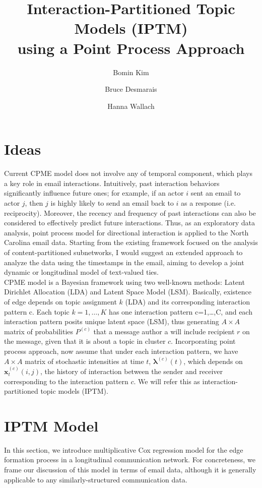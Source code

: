 \documentclass[a4paper]{article}
\title{Interaction-Partitioned Topic Models (IPTM) \\using a Point Process Approach}
\author[1]{Bomin Kim}
\author[1]{Bruce Desmarais}
\author[2,3]{Hanna Wallach}
\affil[1]{Pennsylvania State University}
\affil[2]{Microsoft Research NYC}
\affil[3]{University of Massachusetts Amherst}
\begin{document}
\maketitle
\section{Ideas}
Current CPME model does not involve any of temporal component, which plays a key role in email interactions. Intuitively, past interaction behaviors significantly influence future ones; for example, if an actor $i$ sent an email to actor $j$, then $j$ is highly likely to send an email back to $i$ as a response (i.e. reciprocity). Moreover, the recency and frequency of past interactions can also be considered to effectively predict future interactions. Thus, as an exploratory data analysis, point process model for directional interaction is applied to the North Carolina email data. Starting from the existing framework focused on the analysis of content-partitioned subnetworks, I would suggest an extended approach to analyze the data using the timestamps in the email, aiming to develop a joint dynamic or longitudinal model of text-valued ties.\\ \newline
 CPME model is a Bayesian framework using two well-known methods: Latent Dirichlet Allocation (LDA) and Latent Space Model (LSM). Basically, existence of edge depends on topic assignment $k$ (LDA) and its corresponding interaction pattern c. Each topic $k=1,…,K$ has one interaction pattern c=1,…,C, and each interaction pattern posits unique latent space (LSM), thus generating $A\times A$ matrix of probabilities $P^{(c)}$ that a message author
a will include recipient $r$ on the message, given that it is about
a topic in cluster $c$.  Incorporating point process approach, now assume that under each interaction pattern, we have $A\times A$ matrix of stochastic intensities at time $t$, $\boldsymbol{\lambda}^{(c)}(t)$, which depends on $\boldsymbol{x}^{(c)}_t(i, j)$, the history of interaction between the sender and receiver corresponding to the interaction pattern $c$. We will refer this as  interaction-partitioned topic models (IPTM). 
\section{IPTM Model}
In this section, we introduce multiplicative Cox regression model for the edge formation process in a longitudinal communication network. For concreteness, we frame our discussion of this model in terms of email data, although it is generally applicable to any similarly-structured communication data.
\end{document}

